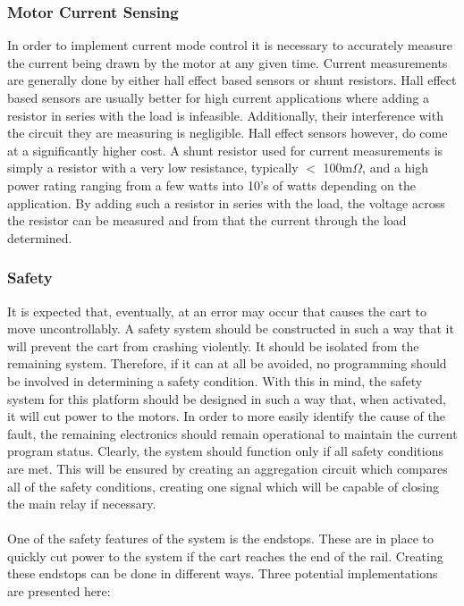 \subsubsection{Motor Current Sensing}
In order to implement current mode control it is necessary to accurately measure the current being drawn by the motor at any given time.
Current measurements are generally done by either hall effect based sensors or shunt resistors. 
Hall effect based sensors are usually better for high current applications where adding a resistor in series with the load is infeasible. 
Additionally, their interference with the circuit they are measuring is negligible.
Hall effect sensors however, do come at a significantly higher cost.
A shunt resistor used for current measurements is simply a resistor with a very low resistance, typically $<$ 100m$\Omega$, and a high power rating ranging from a few watts into 10's of watts depending on the application.
By adding such a resistor in series with the load, the voltage across the resistor can be measured and from that the current through the load determined.


\subsubsection{Safety} %
\label{subsub:safety}
It is expected that, eventually, at an error may occur that causes the cart to move uncontrollably.
A safety system should be constructed in such a way that it will prevent the cart from crashing violently.
It should be isolated from the remaining system.
Therefore, if it can at all be avoided, no programming should be involved in determining a safety condition.
With this in mind, the safety system for this platform should be designed in such a way that, when activated, it will cut power to the motors.
In order to more easily identify the cause of the fault, the remaining electronics should remain operational to maintain the current program status.
Clearly, the system should function only if all safety conditions are met.
This will be ensured by creating an aggregation circuit which compares all of the safety conditions, creating one signal which will be capable of closing the main relay if necessary.
\\~\\
One of the safety features of the system is the endstops.
These are in place to quickly cut power to the system if the cart reaches the end of the rail.
Creating these endstops can be done in different ways.
Three potential implementations are presented here:
